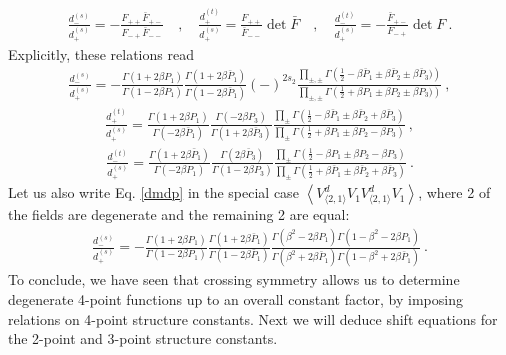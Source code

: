 \documentclass[12pt, a4paper]{article}
\theoremstyle{break}
\begin{document}
\begin{align}
 \frac{d^{(s)}_-}{d^{(s)}_+} = -\frac{F_{++}\bar F_{+-}}{F_{-+}\bar F_{--}}\quad , \quad 
 \frac{d^{(t)}_+}{d^{(s)}_+} = \frac{F_{++}}{\bar F_{--}} \det \bar F \quad , \quad 
 \frac{d^{(t)}_-}{d^{(s)}_+} = -\frac{\bar F_{+-}}{F_{-+}} \det F\ .
\end{align}
Explicitly, these relations read 
\begin{align}
  \frac{d^{(s)}_-}{d^{(s)}_+} = -\frac{\Gamma(1+2\beta P_1)}{\Gamma(1-2\beta P_1)}\frac{\Gamma(1+2\beta\bar P_1)}{\Gamma(1-2\beta\bar P_1)} (-)^{2s_2}
 \frac{\prod_{\pm,\pm}\Gamma\left(\tfrac12 -\beta\bar P_1\pm\beta \bar P_2\pm\beta \bar P_3)\right)}{\prod_{\pm,\pm}
 \Gamma\left(\tfrac12 +\beta P_1\pm \beta P_2\pm\beta P_3)\right)}\  ,
 \label{dmdp}
\end{align}
\begin{align}
 \frac{d^{(t)}_+}{d^{(s)}_+} = \frac{\Gamma\left(1+2\beta P_1\right)}{\Gamma\left(-2\beta\bar P_1\right)} 
 \frac{\Gamma\left(-2\beta P_3\right)}{\Gamma\left(1+2\beta\bar P_3\right)} 
  \frac{\prod_\pm\Gamma\left(\frac12 -\beta\bar P_1 \pm \beta\bar P_2 +\beta\bar P_3\right)}{\prod_\pm\Gamma\left(\frac12+\beta P_1 \pm \beta P_2 -\beta P_3\right)}\ ,
 \label{dpdp}
\end{align}
\begin{align}
 \frac{d^{(t)}_-}{d^{(s)}_+} = \frac{\Gamma\left(1+2\beta \bar P_1\right)}{\Gamma\left(-2\beta P_1\right)} 
 \frac{\Gamma\left(2\beta \bar P_3\right)}{\Gamma\left(1-2\beta P_3\right)} 
  \frac{\prod_\pm\Gamma\left(\frac12 -\beta P_1 \pm \beta P_2 -\beta P_3\right)}{\prod_\pm\Gamma\left(\frac12+\beta \bar P_1 \pm \beta \bar P_2 +\beta \bar P_3\right)}\ .
 \label{dtdp}
\end{align}
Let us also write Eq. \eqref{dmdp} in the special case $\left<V_{\langle 2,1\rangle}^d V_1V_{\langle 2,1\rangle}^d V_1\right>$, where 2 of the fields are degenerate and the remaining 2 are equal:
\begin{align}
\frac{d^{(s)}_-}{d^{(s)}_+} =
-\frac{\Gamma\left(1+2\beta P_1\right)}{\Gamma\left(1-2\beta P_1\right)} \frac{\Gamma\left(1+2\beta \bar P_1\right)}{\Gamma\left(1-2\beta \bar P_1\right)} 
 \frac{\Gamma\left(\beta^2-2\beta P_1\right)\Gamma\left(1-\beta^2-2\beta P_1\right)}{\Gamma\left(\beta^2+2\beta \bar P_1\right)\Gamma\left(1-\beta^2+2\beta \bar P_1\right)}\ .
 \label{ddb}
\end{align}
To conclude, we have seen that crossing symmetry allows us to determine degenerate 4-point functions up to an overall constant factor, by imposing relations on 4-point structure constants. Next we will deduce shift equations for the 2-point and 3-point structure constants. 
\end{document}
